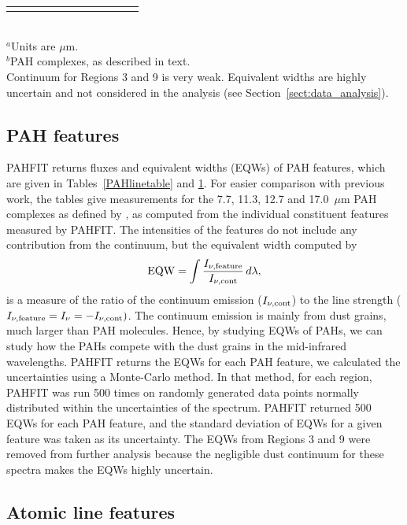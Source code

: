 \documentclass[useAMS,usenatbib,a4paper]{mn2e}
\begin{document}
\begin{table}
\begin{minipage}{200mm}
{\begin{tabular}{l c c  c  c  c  c  c  c  c  c c }
 \hline
 \label{EQW}
\end{tabular}\\
{$^a$Units are $\mu$m.\\
$^b$PAH complexes, as described in text.\\
Continuum for Regions 3 and 9 is very weak.  Equivalent widths are highly uncertain and not considered in the analysis (see Section~\ref{sect:data_analysis}).}
}
\end{minipage}
\end{table}



\subsection{PAH features}
\label{sect:pah}

PAHFIT returns fluxes and equivalent widths (EQWs) of PAH features, which are given in Tables~\ref{PAHlinetable} and \ref{EQW}. 
For easier comparison with previous work, the tables give measurements for the 7.7, 11.3, 12.7 and 17.0~$\mu$m PAH complexes
as defined by \citet{Smith:2007lr}, as computed from the individual constituent features measured by PAHFIT.
The intensities of the features do not include any contribution from the continuum, but the equivalent width computed by
\begin{equation}
{\rm EQW}=\int \frac{I_{\nu,{\rm feature}}}{I_{\nu, {\rm cont}}} \,d\lambda,
\end{equation}
is a measure of the ratio of the continuum emission ($I_{\nu, {\rm cont}} $) to the line strength 
($I_{\nu,{\rm feature}}=I_{\nu} =- I_{\nu, {\rm cont}})$. 
The continuum emission is mainly from dust grains, much larger than PAH molecules. Hence, by studying EQWs of PAHs, 
we can study how the PAHs compete with the dust grains in the mid-infrared wavelengths.  PAHFIT returns the EQWs for each PAH 
feature, we calculated the uncertainties using a Monte-Carlo method. In that method, for each region, PAHFIT was run 500 times on 
randomly generated data points  normally distributed within the uncertainties of the spectrum. PAHFIT returned 500 EQWs for each 
PAH feature, and the standard deviation of EQWs for a given feature was taken as its uncertainty. 
The EQWs from Regions 3 and 9 were removed from further analysis because the negligible dust continuum for these spectra makes
the EQWs highly uncertain.


\subsection{Atomic line features}
\label{sect:atomic}
\end{document}
